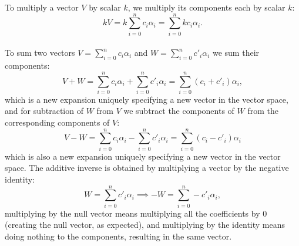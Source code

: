 To multiply a vector $V$ by scalar $k$, we multiply its components each by scalar $k$:
$$
kV = k\sum_{i=0}^{n}c_{i}\alpha_{i}=\sum_{i=0}^{n}kc_{i}\alpha_{i}.
$$
\\
To sum two vectors $V=\sum_{i=0}^{n}c_{i}\alpha_{i}$ and $W=\sum_{i=0}^{n}c'_{i}\alpha_{i}$ we sum their components:
$$
V + W = \sum_{i=0}^{n}c_{i}\alpha_{i}+\sum_{i=0}^{n}c'_{i}\alpha_{i} = \sum_{i=0}^{n}(c_{i}+c'_{i})\alpha_{i},
$$
which is a new expansion uniquely specifying a new vector in the vector space, and for subtraction of $W$ from $V$ we subtract the components of $W$ from the corresponding components of $V$:
$$
V - W = \sum_{i=0}^{n}c_{i}\alpha_{i}-\sum_{i=0}^{n}c'_{i}\alpha_{i} = \sum_{i=0}^{n}(c_{i}-c'_{i})\alpha_{i}
$$
which is also a new expansion uniquely specifying a new vector in the vector space. The additive inverse is obtained by multiplying a vector by the negative identity:
$$
W=\sum_{i=0}^{n}c'_{i}\alpha_{i} \implies -W=\sum_{i=0}^{n}-c'_{i}\alpha_{i},
$$
multiplying by the null vector means multiplying all the coefficients by $0$ (creating the null vector, as expected), and multiplying by the identity means doing nothing to the components, resulting in the same vector.

